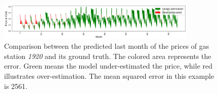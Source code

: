 \begin{figure}
\vspace{-10pt}
  \centering
    \includegraphics[width=0.85\textwidth
    ]{img/prophet_validation.png}
    \caption{Comparison between the predicted last month of the prices of gas station \textit{1920} and its ground truth. The colored area represents the error. Green means the model under-estimated the price, while red illustrates over-estimation. The mean squared error in this example is 2561.
    }
    \label{prophet-validation}
\end{figure}